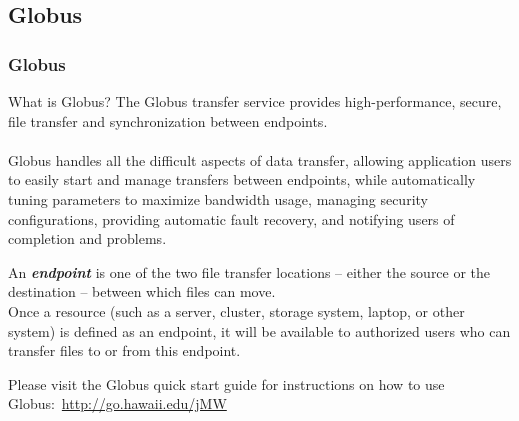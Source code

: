 \subsection{Globus}
\begin{frame}
	\frametitle{Globus}
	\begin{block}{What is Globus?}\footnotesize
	The Globus transfer service provides high-performance, secure, file transfer and synchronization between endpoints.~\\~\\
	Globus handles all the difficult aspects of data transfer, allowing application users to easily start and manage transfers between endpoints, while automatically tuning parameters to maximize bandwidth usage, managing security configurations, providing automatic fault recovery, and notifying users of completion and problems. 
	\end{block}
	\begin{definition}\tiny
	An \textbf{\emph{endpoint}} is one of the two file transfer locations -- either the source or the destination -- between which files can move.~\\Once a resource (such as a server, cluster, storage system, laptop, or other system) is defined as an endpoint, it will be available to authorized users who can transfer files to or from this endpoint.
	\end{definition}
{\tiny Please visit the {\ci} Globus quick start guide for instructions on how to use Globus:~\href{http://go.hawaii.edu/jMW}{http://go.hawaii.edu/jMW}}

\end{frame}



